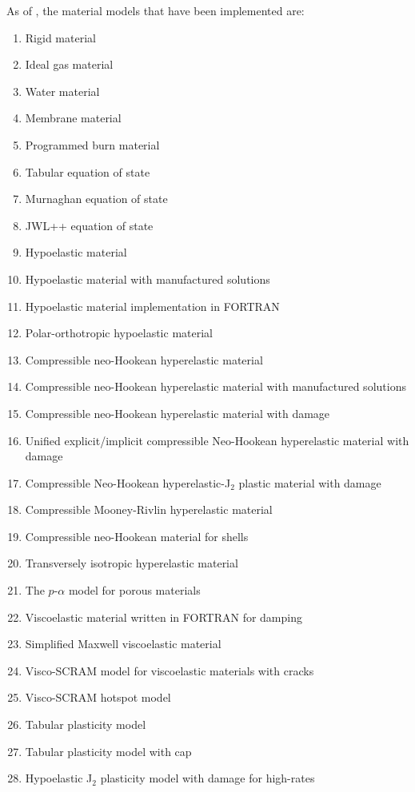 As of \Vaango \bbversion, the material models that have been implemented are:
\begin{enumerate}
  \item Rigid material
  \item Ideal gas material
  \item Water material
  \item Membrane material
  \item Programmed burn material
  \item Tabular equation of state
  \item Murnaghan equation of state
  \item JWL++ equation of state
  \item Hypoelastic material
  \item Hypoelastic material with manufactured solutions
  \item Hypoelastic material implementation in FORTRAN
  \item Polar-orthotropic hypoelastic material
  \item Compressible neo-Hookean hyperelastic material
  \item Compressible neo-Hookean hyperelastic material with manufactured solutions
  \item Compressible neo-Hookean hyperelastic material with damage
  \item Unified explicit/implicit compressible Neo-Hookean hyperelastic material with damage
  \item Compressible Neo-Hookean hyperelastic-J$_2$ plastic material with damage
  \item Compressible Mooney-Rivlin hyperelastic material
  \item Compressible neo-Hookean material for shells
  \item Transversely isotropic hyperelastic material
  \item The $p$-$\alpha$ model for porous materials
  \item Viscoelastic material written in FORTRAN for damping
  \item Simplified Maxwell viscoelastic material
  \item Visco-SCRAM model for viscoelastic materials with cracks
  \item Visco-SCRAM hotspot model
  \item Tabular plasticity model
  \item Tabular plasticity model with cap
  \item Hypoelastic J$_2$ plasticity model with damage for high-rates

\end{enumerate}
